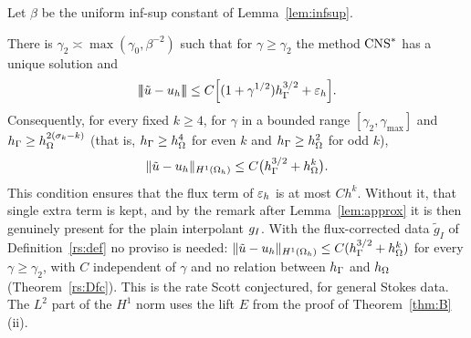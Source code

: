 Let $\beta$ be the uniform inf-sup constant of Lemma~\ref{lem:infsup}.

\begin{theorem}\label{thm:D}
There is $\gamma_2\asymp\max(\gamma_0,\beta^{-2})$ such that for $\gamma\ge\gamma_2$ the method $\mathrm{CNS}^\ast$ has a unique solution and
\[
|\!|\!|\tilde u-u_h|\!|\!|\le C\Bigl[(1+\gamma^{1/2})h_\Gamma^{3/2}+\varepsilon_h\Bigr].
\]
Consequently, for every fixed $k\ge4$, for $\gamma$ in a bounded range $[\gamma_2,\gamma_{\max}]$ and $h_\Gamma\ge h_\Omega^{2(\sigma_k-k)}$ (that is, $h_\Gamma\ge h_\Omega^4$ for even $k$ and $h_\Gamma\ge h_\Omega^2$ for odd $k$),
\[
\lVert \tilde u-u_h\rVert_{H^1(\Omega_h)}\le C\bigl(h_\Gamma^{3/2}+h_\Omega^k\bigr).
\]
This condition ensures that the flux term of $\varepsilon_h$ is at most $Ch^k$. Without it, that single extra term is kept, and by the remark after Lemma~\ref{lem:approx} it is then genuinely present for the plain interpolant $g_I$. With the flux-corrected data $\tilde g_I$ of Definition~\ref{rs:def} no proviso is needed: $\lVert \tilde u-u_h\rVert_{H^1(\Omega_h)}\le C(h_\Gamma^{3/2}+h_\Omega^k)$ for every $\gamma\ge\gamma_2$, with $C$ independent of $\gamma$ and no relation between $h_\Gamma$ and $h_\Omega$ (Theorem~\ref{rs:Dfc}). This is the rate Scott conjectured, for general Stokes data. The $L^2$ part of the $H^1$ norm uses the lift $E$ from the proof of Theorem~\ref{thm:B}(ii).
\end{theorem}

